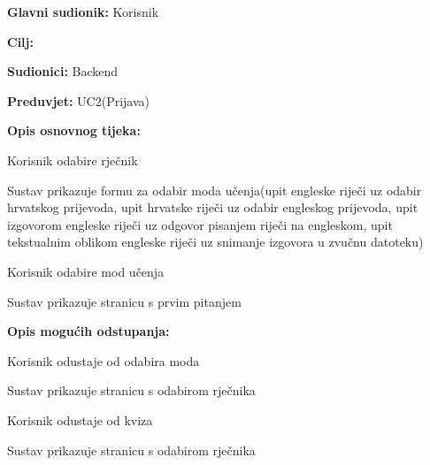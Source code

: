 					\noindent {}
				\begin{packed_item}
					
					\item \textbf{Glavni sudionik: } Korisnik
					\item  \textbf{Cilj:} 
					\item  \textbf{Sudionici:} Backend
					\item  \textbf{Preduvjet:} UC2(Prijava)
					\item  \textbf{Opis osnovnog tijeka:}
					
					\item[] \begin{packed_enum}
						
						\item Korisnik odabire rječnik
						\item Sustav prikazuje formu za odabir moda učenja(upit engleske riječi uz odabir hrvatskog prijevoda, upit hrvatske riječi uz odabir engleskog prijevoda, upit izgovorom engleske riječi uz odgovor pisanjem riječi na engleskom, upit tekstualnim oblikom engleske riječi uz snimanje izgovora u zvučnu datoteku)
						\item Korisnik odabire mod učenja
						\item Sustav prikazuje stranicu s prvim pitanjem
					\end{packed_enum}
					
					\item  \textbf{Opis mogućih odstupanja:}
					
					\item[] \begin{packed_item}
						
						\item[3.a] Korisnik odustaje od odabira moda
						\item[] \begin{packed_enum}
							
							\item Sustav prikazuje stranicu s odabirom rječnika
							
						\end{packed_enum}
						
						\item[4.a] Korisnik odustaje od kviza 
						\item[] \begin{packed_enum}
							
							\item Sustav prikazuje stranicu s odabirom rječnika
							
						\end{packed_enum}
						
					\end{packed_item}
				\end{packed_item}
					
